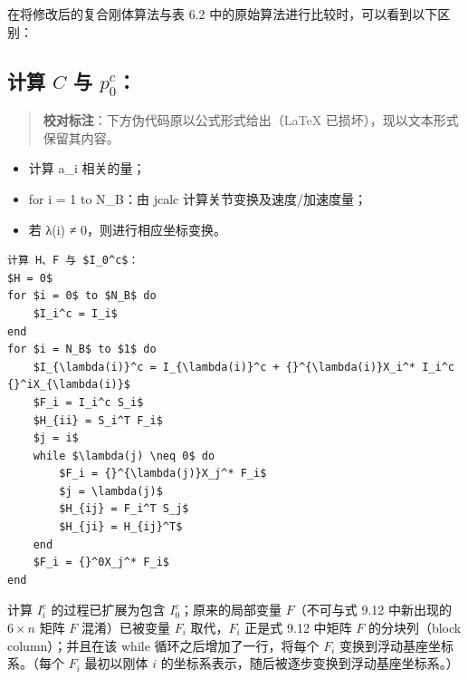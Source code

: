 \documentclass[10pt,a4paper]{book}
\theoremstyle{thmstyle} %
\theoremstyle{defstyle} %
\theoremstyle{prostyle} %
\begin{document}
在将修改后的复合刚体算法与表 6.2 中的原始算法进行比较时，可以看到以下区别：



\subsection{计算 $C$ 与 $p_{0}^{c}$：}





\begin{quote}

\textbf{校对标注}：下方伪代码原以公式形式给出（LaTeX 已损坏），现以文本形式保留其内容。

\end{quote}





\begin{itemize}

  \item 计算 a\_i 相关的量；

  \item for i = 1 to N\_B：由 jcalc 计算关节变换及速度/加速度量；

  \item 若 λ(i) ≠ 0，则进行相应坐标变换。

\end{itemize}





\begin{verbatim}
计算 H、F 与 $I_0^c$：
$H = 0$
for $i = 0$ to $N_B$ do
    $I_i^c = I_i$
end
for $i = N_B$ to $1$ do
    $I_{\lambda(i)}^c = I_{\lambda(i)}^c + {}^{\lambda(i)}X_i^* I_i^c {}^iX_{\lambda(i)}$
    $F_i = I_i^c S_i$
    $H_{ii} = S_i^T F_i$
    $j = i$
    while $\lambda(j) \neq 0$ do
        $F_i = {}^{\lambda(j)}X_j^* F_i$
        $j = \lambda(j)$
        $H_{ij} = F_i^T S_j$
        $H_{ji} = H_{ij}^T$
    end
    $F_i = {}^0X_j^* F_i$
end
\end{verbatim}




计算 $I_{i}^{c}$ 的过程已扩展为包含 $I_{0}^{c}$；原来的局部变量 $F$（不可与式 9.12 中新出现的 $6 \times n$ 矩阵 $F$ 混淆）已被变量 $F_{i}$ 取代，$F_{i}$ 正是式 9.12 中矩阵 $F$ 的分块列（block column）；并且在该 while 循环之后增加了一行，将每个 $F_{i}$ 变换到浮动基座坐标系。（每个 $F_{i}$ 最初以刚体 $i$ 的坐标系表示，随后被逐步变换到浮动基座坐标系。）
\end{document}
